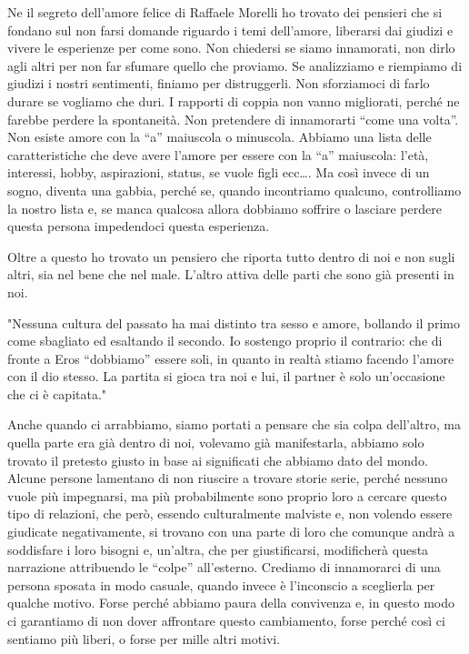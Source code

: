 \documentclass[12pt]{book} %
\begin{document}
Ne il segreto dell'amore felice di Raffaele Morelli ho trovato dei
pensieri che si fondano sul non farsi domande riguardo i temi dell'amore, liberarsi dai giudizi e
vivere le esperienze per come sono. Non chiedersi se siamo innamorati, non dirlo agli altri per non far sfumare quello
che proviamo. Se analizziamo e riempiamo di giudizi i nostri sentimenti, finiamo per distruggerli. Non sforziamoci di
farlo durare se vogliamo che duri. I rapporti di coppia non vanno migliorati, perché ne farebbe perdere la spontaneità.
Non pretendere di innamorarti “come una volta”. Non esiste amore con la “a” maiuscola o minuscola. Abbiamo una lista
delle caratteristiche che deve avere l'amore per essere con la “a” maiuscola:
l'età, interessi, hobby, aspirazioni, status, se vuole figli ecc…. Ma così invece di un sogno,
diventa una gabbia, perché se, quando incontriamo qualcuno, controlliamo la nostro lista e, se manca qualcosa allora
dobbiamo soffrire o lasciare perdere questa persona impedendoci questa esperienza.

Oltre a questo ho trovato un pensiero che riporta tutto dentro di noi e non sugli altri, sia nel bene che nel male.
L'altro attiva delle parti che sono già presenti in noi. 

"Nessuna cultura del passato ha mai distinto tra sesso e amore, bollando il primo come sbagliato ed
esaltando il secondo. Io sostengo proprio il contrario: che di fronte a Eros “dobbiamo” essere soli, in quanto in
realtà stiamo facendo l'amore con il dio stesso. La partita si gioca tra noi e lui, il partner è
solo un'occasione che ci è capitata." 

Anche quando ci arrabbiamo, siamo portati a pensare che sia colpa dell'altro, ma quella parte era
già dentro di noi, volevamo già manifestarla, abbiamo solo trovato il pretesto giusto in base ai significati che
abbiamo dato del mondo. Alcune persone lamentano di non riuscire a trovare storie serie, perché nessuno vuole più
impegnarsi, ma più probabilmente sono proprio loro a cercare questo tipo di relazioni, che però, essendo culturalmente
malviste e, non volendo essere giudicate negativamente, si trovano con una parte di loro che comunque andrà a
soddisfare i loro bisogni e, un'altra, che per giustificarsi, modificherà questa narrazione
attribuendo le “colpe” all'esterno. Crediamo di innamorarci di una persona sposata in modo
casuale, quando invece è l'inconscio a sceglierla per qualche motivo. Forse perché abbiamo paura
della convivenza e, in questo modo ci garantiamo di non dover affrontare questo cambiamento, forse perché così ci
sentiamo più liberi, o forse per mille altri motivi.
\end{document}
